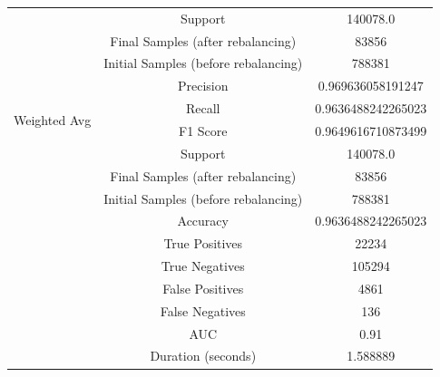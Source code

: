 \begin{longtable}{|c|c|c|}
 & Support & 140078.0 \\
 & Final Samples (after rebalancing) & 83856 \\
 & Initial Samples (before rebalancing) & 788381 \\
\hline
\multirow{4}{*}{Weighted Avg} & Precision & 0.969636058191247 \\
 & Recall & 0.9636488242265023 \\
 & F1 Score & 0.9649616710873499 \\
 & Support & 140078.0 \\
 & Final Samples (after rebalancing) & 83856 \\
 & Initial Samples (before rebalancing) & 788381 \\
\hline
& Accuracy & 0.9636488242265023 \\ \hline
& True Positives & 22234 \\ \hline
& True Negatives & 105294 \\ \hline
& False Positives & 4861 \\ \hline
& False Negatives & 136 \\ \hline
& AUC & 0.91 \\ \hline
& Duration (seconds) & 1.588889 \\ \hline
\end{longtable}


